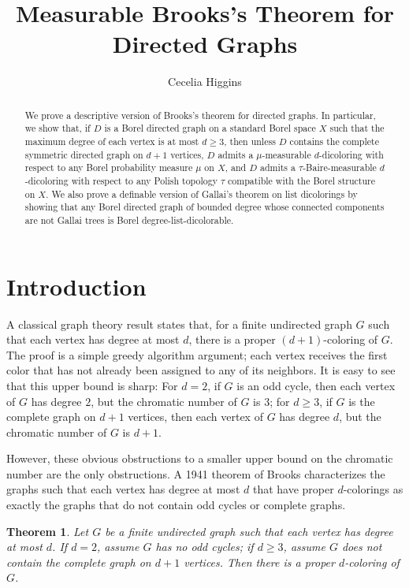 \documentclass[psamsfonts]{amsart}
\newtheorem{thm}{Theorem}[section]
\theoremstyle{definition}
\theoremstyle{remark}
\numberwithin{equation}{section}
\begin{document}
\author{Cecelia Higgins}

\title{Measurable Brooks's Theorem for Directed Graphs}

\begin{abstract}
    We prove a descriptive version of Brooks's theorem for directed graphs. In particular, we show that, if $D$ is a Borel directed graph on a standard Borel space $X$ such that the maximum degree of each vertex is at most $d \geq 3$, then unless $D$ contains the complete symmetric directed graph on $d + 1$ vertices, $D$ admits a $\mu$-measurable $d$-dicoloring with respect to any Borel probability measure $\mu$ on $X$, and $D$ admits a $\tau$-Baire-measurable $d$-dicoloring with respect to any Polish topology $\tau$ compatible with the Borel structure on $X$. We also prove a definable version of Gallai's theorem on list dicolorings by showing that any Borel directed graph of bounded degree whose connected components are not Gallai trees is Borel degree-list-dicolorable.
\end{abstract}

\maketitle
\section{Introduction}
A classical graph theory result states that, for a finite undirected graph $G$ such that each vertex has degree at most $d$, there is a proper $(d+1)$-coloring of $G$. The proof is a simple greedy algorithm argument; each vertex receives the first color that has not already been assigned to any of its neighbors. It is easy to see that this upper bound is sharp: For $d = 2$,  if $G$ is an odd cycle, then each vertex of $G$ has degree $2$, but the chromatic number of $G$ is $3$; for $d \geq 3$, if $G$ is the complete graph on $d + 1$ vertices, then each vertex of $G$ has degree $d$, but the chromatic number of $G$ is $d + 1$.

However, these obvious obstructions to a smaller upper bound on the chromatic number are the only obstructions. A 1941 theorem of Brooks characterizes the graphs such that each vertex has degree at most $d$ that have proper $d$-colorings as exactly the graphs that do not contain odd cycles or complete graphs.

\begin{thm}
\label{thm : brooks}
    \cite{brooks1941} Let $G$ be a finite undirected graph such that each vertex has degree at most $d$. If $d = 2$, assume $G$ has no odd cycles; if $d \geq 3$, assume $G$ does not contain the complete graph on $d + 1$ vertices. Then there is a proper $d$-coloring of $G$.
\end{thm}
\end{document}
